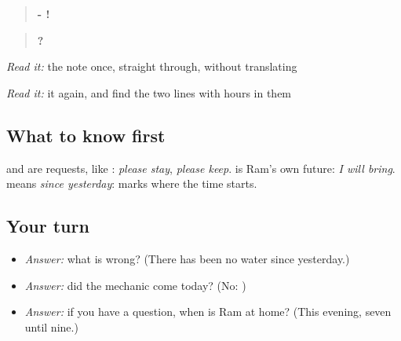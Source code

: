 \begin{tcolorbox}[breakable,skin=enhanced,colback=orange!6,colframe=orange!45!black,boxrule=0.5pt,arc=1mm,left=6pt,right=6pt,top=4pt,bottom=4pt,fonttitle=\bfseries,title={Read this}]
\begin{quote}
\textbf{- !}
\end{quote}

\begin{quote}
\textbf{   } \textbf{    } \textbf{   } \textbf{    } \textbf{  } \textbf{        } \textbf{  } \textbf{   } \textbf{ ?         } \textbf{} \textbf{}
\end{quote}

\emph{Read it:} the note once, straight through, without translating

\emph{Read it:} it again, and find the two lines with hours in them
\end{tcolorbox}

\subsection*{What to know first}
\textbf{} and \textbf{} are requests, like \textbf{}: \emph{please stay}, \emph{please keep}. \textbf{} is Ram's own future: \emph{I will bring}. \textbf{ } means \emph{since yesterday}: \textbf{} marks where the time starts.

\subsection*{Your turn}
\begin{itemize}
\raggedright
  \item \emph{Answer:} what is wrong? (There has been no water since yesterday.)
  \item \emph{Answer:} did the mechanic come today? (No: \textbf{   })
  \item \emph{Answer:} if you have a question, when is Ram at home? (This evening, seven until nine.)
\end{itemize}

